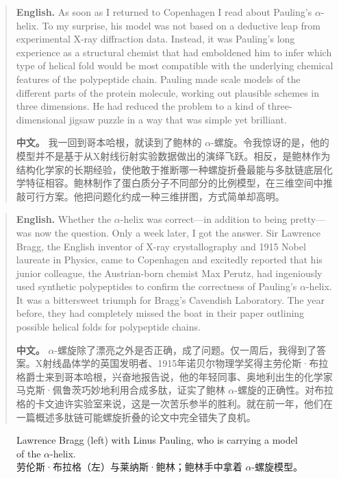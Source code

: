 \begin{quote}
\noindent\textbf{English.} As soon as I returned to Copenhagen I read about Pauling's \(\alpha\)-helix. To my surprise, his model was not based on a deductive leap from experimental X-ray diffraction data. Instead, it was Pauling's long experience as a structural chemist that had emboldened him to infer which type of helical fold would be most compatible with the underlying chemical features of the polypeptide chain. Pauling made scale models of the different parts of the protein molecule, working out plausible schemes in three dimensions. He had reduced the problem to a kind of three-dimensional jigsaw puzzle in a way that was simple yet brilliant.

\smallskip
\noindent\textbf{中文。} 我一回到哥本哈根，就读到了鲍林的 \(\alpha\)-螺旋。令我惊讶的是，他的模型并不是基于从X射线衍射实验数据做出的演绎飞跃。相反，是鲍林作为结构化学家的长期经验，使他敢于推断哪一种螺旋折叠最能与多肽链底层化学特征相容。鲍林制作了蛋白质分子不同部分的比例模型，在三维空间中推敲可行方案。他把问题化约成一种三维拼图，方式简单却高明。
\end{quote}

\begin{quote}
\noindent\textbf{English.} Whether the \(\alpha\)-helix was correct---in addition to being pretty---was now the question. Only a week later, I got the answer. Sir Lawrence Bragg, the English inventor of X-ray crystallography and 1915 Nobel laureate in Physics, came to Copenhagen and excitedly reported that his junior colleague, the Austrian-born chemist Max Perutz, had ingeniously used synthetic polypeptides to confirm the correctness of Pauling's \(\alpha\)-helix. It was a bittersweet triumph for Bragg's Cavendish Laboratory. The year before, they had completely missed the boat in their paper outlining possible helical folds for polypeptide chains.

\smallskip
\noindent\textbf{中文。} \(\alpha\)-螺旋除了漂亮之外是否正确，成了问题。仅一周后，我得到了答案。X射线晶体学的英国发明者、1915年诺贝尔物理学奖得主劳伦斯·布拉格爵士来到哥本哈根，兴奋地报告说，他的年轻同事、奥地利出生的化学家马克斯·佩鲁茨巧妙地利用合成多肽，证实了鲍林 \(\alpha\)-螺旋的正确性。对布拉格的卡文迪许实验室来说，这是一次苦乐参半的胜利。就在前一年，他们在一篇概述多肽链可能螺旋折叠的论文中完全错失了良机。
\end{quote}

\begin{figure}[htbp]
\centering
{}
\caption{Lawrence Bragg (left) with Linus Pauling, who is carrying a model of the \(\alpha\)-helix.\\劳伦斯·布拉格（左）与莱纳斯·鲍林；鲍林手中拿着 \(\alpha\)-螺旋模型。}
\end{figure}

